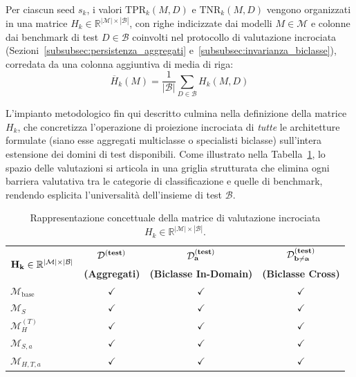 Per ciascun seed $s_k$, i valori $\text{TPR}_k(M,D)$ e $\text{TNR}_k(M,D)$ vengono organizzati in una matrice $H_k \in \mathbb{R}^{|\mathcal{M}| \times |\mathcal{B}|}$, con righe indicizzate dai modelli $M \in \mathcal{M}$ e colonne dai benchmark di test $D \in \mathcal{B}$ coinvolti nel protocollo di valutazione incrociata (Sezioni~\ref{subsubsec:persistenza_aggregati} e~\ref{subsubsec:invarianza_biclasse}), corredata da una colonna aggiuntiva di media di riga:
\begin{equation}
    \overline{H}_k(M) = \frac{1}{|\mathcal{B}|} \sum_{D \in \mathcal{B}} H_k(M, D)
    \label{eq:row_mean}
\end{equation}

L'impianto metodologico fin qui descritto culmina nella definizione della matrice $H_k$, che concretizza l'operazione di proiezione incrociata di \textit{tutte} le architetture formulate (siano esse aggregati multiclasse o specialisti biclasse) sull'intera estensione dei domini di test disponibili. Come illustrato nella Tabella~\ref{tab:matrice_incrociata}, lo spazio delle valutazioni si articola in una griglia strutturata che elimina ogni barriera valutativa tra le categorie di classificazione e quelle di benchmark, rendendo esplicita l'universalità dell'insieme di test $\mathcal{B}$.

\begin{table}[H]
    \centering
    \small
    \caption{Rappresentazione concettuale della matrice di valutazione incrociata $H_k \in \mathbb{R}^{|\mathcal{M}| \times |\mathcal{B}|}$.}
    \label{tab:matrice_incrociata}
    \begin{tabular}{l c c c}
        \toprule
        \multirow{2}{*}{$\bf{H_k \in \mathbb{R}^{|\mathcal{M}| \times |\mathcal{B}|}}$} & $\bf{\mathcal{D}^{(\text{\bfseries test})}}$ & $\bf{\mathcal{D}_a^{(\text{\bfseries test})}}$ & $\bf{\mathcal{D}_{b\neq a}^{(\text{\bfseries test})}}$ \\
        & \textbf{(Aggregati)} & \textbf{(Biclasse In-Domain)} & \textbf{(Biclasse Cross)} \\
        \midrule
        $\mathcal{M}_{\text{base}}$ & $\checkmark$ & $\checkmark$ & $\checkmark$ \\
        $\mathcal{M}_S$            & $\checkmark$ & $\checkmark$ & $\checkmark$ \\
        $\mathcal{M}_H^{(T)}$      & $\checkmark$ & $\checkmark$ & $\checkmark$ \\
        $\mathcal{M}_{S,a}$        & $\checkmark$ & $\checkmark$ & $\checkmark$ \\
        $\mathcal{M}_{H,T,a}$      & $\checkmark$ & $\checkmark$ & $\checkmark$ \\
        \bottomrule
    \end{tabular}
\end{table}

